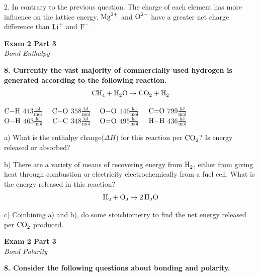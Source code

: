 \documentclass{article}
\begin{document}
    2. In contrary to the previous question. The charge of each element has more influence on the lattice energy. $\ce{Mg^{2+}}$ and $\ce{O^{2-}}$ have a greater net charge difference than $\ce{Li^{+}}$ and $\ce{F^{-}}$
    \pagebreak

    \begin{center}
        \textbf{Exam 2 Part 3}\\
        \textit{Bond Enthalpy}
    \end{center}
    \textbf{8. Currently the vast majority of commercially used hydrogen is generated according to the following reaction.}
    $$\ce{CH4} + \ce{H2O} \rightarrow \ce{CO2} + \ce{H2}$$
    \begin{center}
        $\ce{C-H}$ $413 \frac{\si{\kilo\joule}}{\si{\mol}} \quad$
        $\ce{C-O}$ $358 \frac{\si{\kilo\joule}}{\si{\mol}} \quad$
        $\ce{O-O}$ $146 \frac{\si{\kilo\joule}}{\si{\mol}} \quad$
        $\ce{C=O}$ $799 \frac{\si{\kilo\joule}}{\si{\mol}}$\\[.2cm]
        $\ce{O-H}$ $463 \frac{\si{\kilo\joule}}{\si{\mol}} \quad$
        $\ce{C-C}$ $348 \frac{\si{\kilo\joule}}{\si{\mol}} \quad$
        $\ce{O=O}$ $495 \frac{\si{\kilo\joule}}{\si{\mol}} \quad$
        $\ce{H-H}$ $436 \frac{\si{\kilo\joule}}{\si{\mol}}$
    \end{center}

    a) What is the enthalpy change($\Delta H$) for this reaction per $\ce{CO2}$? Is energy released or absorbed?

    b) There are a variety of means of recovering energy from $\ce{H2}$, either from giving heat through combustion or electricity electrochemically from a fuel cell. What is the energy released in this reaction?
    $$\ce{H2} + \ce{O2} \rightarrow \ce{2H2O}$$

    c) Combining a) and b), do some stoichiometry to find the net energy released per $\ce{CO2}$ produced.
    \pagebreak

    \begin{center}
        \textbf{Exam 2 Part 3}\\
        \textit{Bond Polarity}
    \end{center}
    \textbf{8. Consider the following questions about bonding and polarity.}
\end{document}
